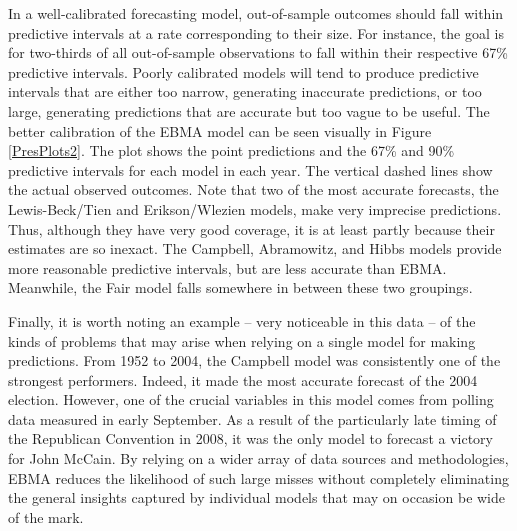  In a well-calibrated forecasting model, out-of-sample outcomes should
 fall within predictive intervals at a rate corresponding to their
 size.  For instance, the goal is for two-thirds of all out-of-sample
 observations to fall within their respective 67\% predictive
 intervals.  Poorly calibrated models will tend to produce predictive
 intervals that are either too narrow, generating inaccurate
 predictions, or too large, generating predictions that are accurate
 but too vague to be useful.  The better calibration of the EBMA model
 can be seen visually in Figure \ref{PresPlots2}.  The plot shows the
 point predictions and the 67\% and 90\% predictive intervals for each
 model in each year.  The vertical dashed lines show the actual
 observed outcomes.  Note that two of the most accurate forecasts, the
 Lewis-Beck/Tien and Erikson/Wlezien models, make very imprecise
 predictions.  Thus, although they have very good coverage, it is at
 least partly because their estimates are so inexact.  The Campbell,
 Abramowitz, and Hibbs models provide more reasonable predictive
 intervals, but are less accurate than EBMA. Meanwhile, the Fair model
 falls somewhere in between these two groupings.


 Finally, it is worth noting an example -- very noticeable in this
 data -- of the kinds of problems that may arise when relying on a
 single model for making predictions.  From 1952 to 2004, the Campbell
 model was consistently one of the strongest performers.  Indeed, it
 made the most accurate forecast of the 2004 election.  However, one
 of the crucial variables in this model comes from polling data
 measured in early September.  As a result of the particularly late
 timing of the Republican Convention in 2008, it was the only model to
 forecast a victory for John McCain.  By relying on a wider array of
 data sources and methodologies, EBMA reduces the likelihood of such
 large misses without completely eliminating the general insights
 captured by individual models that may on occasion be wide of the
 mark.

